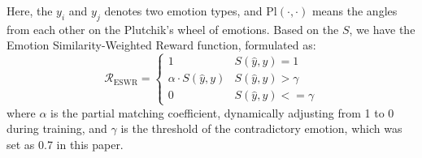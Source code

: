 \documentclass[11pt]{article}
\begin{document}
Here, the $y_{i}$ and $y_{j}$ denotes two emotion types, and $\mathrm{Pl}(\cdot, \cdot)$ means the angles from each other on the Plutchik's wheel of emotions.
Based on the $S$, we have the Emotion Similarity-Weighted Reward function, formulated as:
\begin{equation}
	\mathcal{R}_{\mathrm{ESWR}} =
	\begin{cases}
		1                          & S(\hat{y}, y) = 1     \\
		\alpha \cdot S(\hat{y}, y) & S(\hat{y}, y)>\gamma  \\
		0                          & S(\hat{y}, y)<=\gamma
	\end{cases}
\end{equation}
where $\alpha$ is the partial matching coefficient, dynamically adjusting from 1 to 0 during training, and $\gamma$ is the threshold of the contradictory emotion, which was set as 0.7 in this paper.




\end{document}

